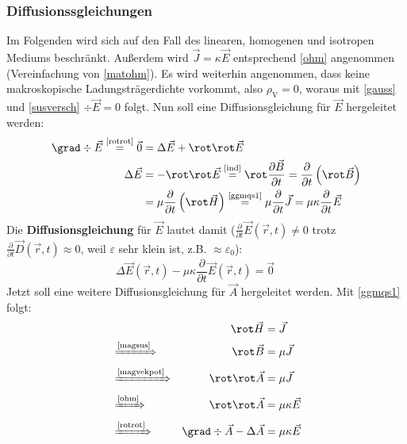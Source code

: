 	  \subsubsection{Diffusionssgleichungen}
	  Im Folgenden wird sich auf den Fall des linearen, homogenen und isotropen Mediums beschränkt. Außerdem wird $\vec{J}=\kappa\vec{E}$ entsprechend \ref{ohm} angenommen (Vereinfachung von \ref{matohm}). Es wird weiterhin angenommen, dass keine makroskopische Ladungsträgerdichte vorkommt, also \(\rho_\text{V} = 0 \), woraus mit \ref{gauss} und \ref{susversch} $\div \vec{E} = 0$ folgt. Nun soll eine Diffusionsgleichung für $\vec{E}$ hergeleitet werden:
			        \begin{align*}
				        \grad \div \vec{E} \stackrel{\text{\ref{rotrot}}}{=} \vec{0}                                                            & = \Delta \vec{E} + \rot \rot \vec{E}                                                                                                                     \\
				        \Delta \vec{E}                                                                          & = - \rot \rot \vec{E} \stackrel{\text{\ref{ind}}}{=} \rot \frac{\partial\vec{B} }{\partial t} = \frac{\partial}{\partial t} \left( \rot \vec{B}  \right)                              \\
                   & = \mu \frac{\partial}{\partial t} \left( \rot \vec{H}  \right) \stackrel{\text{\ref{ggmqs1}}}{=} \mu \frac{\partial}{\partial t} \vec{J} = \mu\kappa \frac{\partial}{\partial t} \vec{E} 	      
			        \end{align*}
			        Die \textbf{Diffusionsgleichung} für $\vec{E}$ lautet damit ($\frac{\partial}{\partial t} \vec{E}(\vec{r} , t)\neq 0$ trotz $\frac{\partial}{\partial t} \vec{D}(\vec{r} , t)\approx 0$, weil $\varepsilon$ sehr klein ist, z.B. $\approx \varepsilon_0$):
			        \begin{equation}\label{diffE}
			        	 \boxed{\Delta \vec{E}(\vec{r} , t) -\mu\kappa \frac{\partial}{\partial t} \vec{E}(\vec{r} , t)  = \vec{0}} \quad \quad 
			        \end{equation}
			 Jetzt soll eine weitere Diffusionsgleichung für $\vec{A}$ hergeleitet werden. Mit \ref{ggmqs1} folgt:
			        \begin{align}
					       && \rot \vec{H}  &= \vec{J} \nonumber\\
					        & \xRightarrow{\text{\ref{magsus}}}&  \rot \vec{B}  &= \mu \vec{J}\nonumber\\
					         & \xRightarrow{\text{\ref{magvekpot}}} & \rot \rot  \vec{A} &= \mu \vec{J}\nonumber\\
					      & \xRightarrow{\text{\ref{ohm}}}&  \rot \rot  \vec{A} &= \mu\kappa \vec{E} \nonumber\\
					       &\xRightarrow{\text{\ref{rotrot}}}& \grad \div  \vec{A} -\Delta  \vec{A} &= \mu\kappa \vec{E} \label{diffschritt1}
					       \end{align}
